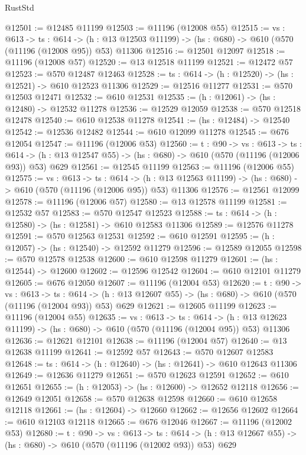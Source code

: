 \begin{lexlean}{RustStd}
\begin{coremodule}
@12501 := @12485 @11199
@12503 := @11196 (@12008 @55)
@12515 := {vs : @613} ->
  {ts : @614} ->
  (h : @13 @12503 @11199) -> (hs : @680) -> @610 (@570 (@11196 (@12008 @95)) @53) @11306
@12516 := @12501 @12097
@12518 := @11196 (@12008 @57)
@12520 := @13 @12518 @11199
@12521 := @12472 @57
@12523 := @570 @12487 @12463
@12528 := {ts : @614} -> (h : @12520) -> (hs : @12521) -> @610 @12523 @11306
@12529 := @12516 @11277
@12531 := @570 @12503 @12471
@12532 := @610 @12531
@12535 := (h : @12061) -> (hs : @12480) -> @12532 @11278
@12536 := @12529 @12059
@12538 := @570 @12518 @12478
@12540 := @610 @12538 @11278
@12541 := (hs : @12484) -> @12540
@12542 := @12536 @12482
@12544 := @610 @12099 @11278
@12545 := @676 @12054
@12547 := @11196 (@12006 @53)
@12560 := {t : @90} ->
  {vs : @613} ->
  {ts : @614} -> (h : @13 @12547 @55) -> (hs : @680) -> @610 (@570 (@11196 (@12006 @93)) @53) @629
@12561 := @12545 @11199
@12563 := @11196 (@12006 @55)
@12575 := {vs : @613} ->
  {ts : @614} ->
  (h : @13 @12563 @11199) -> (hs : @680) -> @610 (@570 (@11196 (@12006 @95)) @53) @11306
@12576 := @12561 @12099
@12578 := @11196 (@12006 @57)
@12580 := @13 @12578 @11199
@12581 := @12532 @57
@12583 := @570 @12547 @12523
@12588 := {ts : @614} -> (h : @12580) -> (hs : @12581) -> @610 @12583 @11306
@12589 := @12576 @11278
@12591 := @570 @12563 @12531
@12592 := @610 @12591
@12595 := (h : @12057) -> (hs : @12540) -> @12592 @11279
@12596 := @12589 @12055
@12598 := @570 @12578 @12538
@12600 := @610 @12598 @11279
@12601 := (hs : @12544) -> @12600
@12602 := @12596 @12542
@12604 := @610 @12101 @11279
@12605 := @676 @12050
@12607 := @11196 (@12004 @53)
@12620 := {t : @90} ->
  {vs : @613} ->
  {ts : @614} -> (h : @13 @12607 @55) -> (hs : @680) -> @610 (@570 (@11196 (@12004 @93)) @53) @629
@12621 := @12605 @11199
@12623 := @11196 (@12004 @55)
@12635 := {vs : @613} ->
  {ts : @614} ->
  (h : @13 @12623 @11199) -> (hs : @680) -> @610 (@570 (@11196 (@12004 @95)) @53) @11306
@12636 := @12621 @12101
@12638 := @11196 (@12004 @57)
@12640 := @13 @12638 @11199
@12641 := @12592 @57
@12643 := @570 @12607 @12583
@12648 := {ts : @614} -> (h : @12640) -> (hs : @12641) -> @610 @12643 @11306
@12649 := @12636 @11279
@12651 := @570 @12623 @12591
@12652 := @610 @12651
@12655 := (h : @12053) -> (hs : @12600) -> @12652 @12118
@12656 := @12649 @12051
@12658 := @570 @12638 @12598
@12660 := @610 @12658 @12118
@12661 := (hs : @12604) -> @12660
@12662 := @12656 @12602
@12664 := @610 @12103 @12118
@12665 := @676 @12046
@12667 := @11196 (@12002 @53)
@12680 := {t : @90} ->
  {vs : @613} ->
  {ts : @614} -> (h : @13 @12667 @55) -> (hs : @680) -> @610 (@570 (@11196 (@12002 @93)) @53) @629

\end{coremodule}
\end{lexlean}
